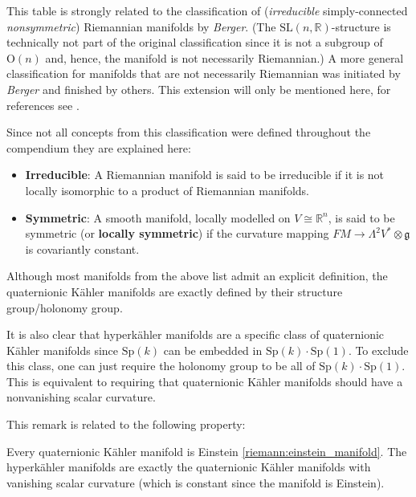     \begin{remark*}
        This table is strongly related to the classification of (\textit{irreducible} simply-connected \textit{nonsymmetric}) Riemannian manifolds by \textit{Berger}. (The $\mathrm{SL}(n,\mathbb{R})$-structure is technically not part of the original classification since it is not a subgroup of $\mathrm{O}(n)$ and, hence, the manifold is not necessarily Riemannian.) A more general classification for manifolds that are not necessarily Riemannian was initiated by \textit{Berger} and finished by others. This extension will only be mentioned here, for references see \cite{diffgeom_physics}.

        Since not all concepts from this classification were defined throughout the compendium they are explained here:
        \begin{itemize}
            \item\textbf{Irreducible}: A Riemannian manifold is said to be irreducible if it is not locally isomorphic to a product of Riemannian manifolds.
            \item\textbf{Symmetric}: A smooth manifold, locally modelled on $V\cong\mathbb{R}^n$, is said to be symmetric (or \textbf{locally symmetric}) if the curvature mapping $FM\rightarrow\Lambda^2V^*\otimes\mathfrak{g}$ is covariantly constant.
        \end{itemize}
    \end{remark*}

    \begin{remark}
        Although most manifolds from the above list admit an explicit definition, the quaternionic K\"ahler manifolds are exactly defined by their structure group/holonomy group.

        It is also clear that hyperk\"ahler manifolds are a specific class of quaternionic K\"ahler manifolds since $\mathrm{Sp}(k)$ can be embedded in $\mathrm{Sp}(k)\cdot\mathrm{Sp}(1)$. To exclude this class, one can just require the holonomy group to be all of $\mathrm{Sp}(k)\cdot\mathrm{Sp}(1)$. This is equivalent to requiring that quaternionic K\"ahler manifolds should have a nonvanishing scalar curvature.
    \end{remark}
    This remark is related to the following property:
    \begin{property}[Einstein]
        Every quaternionic K\"ahler manifold is Einstein \ref{riemann:einstein_manifold}. The hyperk\"ahler manifolds are exactly the quaternionic K\"ahler manifolds with vanishing scalar curvature (which is constant since the manifold is Einstein).
    \end{property}